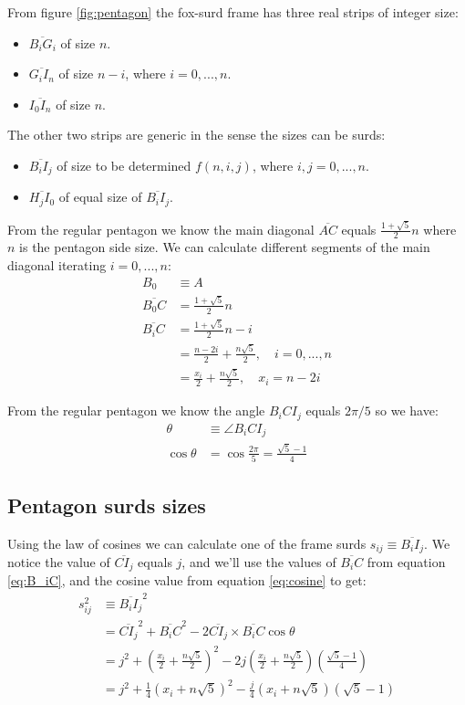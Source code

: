 \documentclass[11pt]{article}
\begin{document}
From figure \ref{fig:pentagon} the fox-surd frame has three real strips of integer size:
\begin{itemize}
    \item $\overline{B_iG_i}$ of size $n$.
    \item $\overline{G_iI_n}$ of size $n-i$, where $i = 0,...,n$.
    \item $\overline{I_0I_n}$ of size $n$.
\end{itemize}
The other two strips are generic in the sense the sizes can be surds:
\begin{itemize}
	\item $\overline{B_iI_j}$ of size to be determined $f(n,i,j)$, where $i,j = 0,...,n$.
	\item $\overline{H_jI_0}$ of equal size of $\overline{B_iI_j}$.
\end{itemize}

From the regular pentagon we know the main diagonal $\overline{AC}$ equals
$\frac{1+\sqrt{5}}{2}n$ where $n$ is the pentagon side size. We can calculate different
segments of the main diagonal iterating $i = 0,...,n$:
\begin{align}
B_0 &\equiv A \nonumber\\
\overline{B_0C} &= \frac{1+\sqrt{5}}{2}n \\
\overline{B_iC} &= \frac{1+\sqrt{5}}{2}n - i \nonumber\\
 &= \frac{n-2i}{2} + \frac{n\sqrt{5}}{2}, \quad i = 0, ..., n \nonumber\\
 &= \frac{x_i}{2} + \frac{n\sqrt{5}}{2}, \quad x_i = n - 2i \label{eq:B_iC}
\end{align}

From the regular pentagon we know the angle ${B_iCI_j}$ equals $2\pi / 5$ so we have:
\begin{align}
\theta &\equiv \angle{B_iCI_j} \\
\cos\theta &= \cos\frac{2\pi}{5} = \frac{\sqrt{5}-1}{4} \label{eq:cosine}
\end{align}

\subsection{Pentagon surds sizes}

Using the law of cosines we can calculate one of the frame surds $s_{ij} \equiv \overline{B_iI_j}$.
We notice the value of $\overline{CI_j}$ equals $j$, and we'll use the values of $\overline{B_iC}$ from equation \ref{eq:B_iC}, and the cosine value from equation \ref{eq:cosine} to get:
\begin{align}
s_{ij}^2 &\equiv \overline{B_iI_j}^2 \\
 &= \overline{CI_j}^2 + \overline{B_iC}^2 
 - 2\overline{CI_j}\times\overline{B_iC}\cos\theta  \nonumber\\
 &= j^2 + \left(\frac{x_i}{2} + \frac{n\sqrt{5}}{2}\right)^2
 - 2j\left(\frac{x_i}{2} + \frac{n\sqrt{5}}{2}\right)\left(\frac{\sqrt{5} - 1}{4}\right) \\
 &= j^2 + \frac{1}{4}\left(x_i + n\sqrt{5}\right)^2
 - \frac{j}{4}\left(x_i + n\sqrt{5}\right)\left(\sqrt{5}-1\right)
\end{align}   
\end{document}
